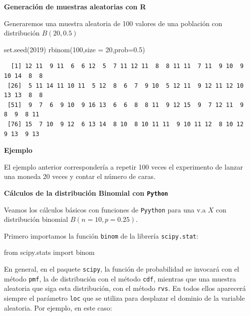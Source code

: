 \documentclass[
  letterpaper,
  DIV=11,
  numbers=noendperiod]{scrreprt}
\newenvironment{Shaded}{\begin{snugshade}}{\end{snugshade}}
\newcommand{\AttributeTok}[1]{\textcolor[rgb]{0.40,0.45,0.13}{#1}}
\newcommand{\DecValTok}[1]{\textcolor[rgb]{0.68,0.00,0.00}{#1}}
\newcommand{\FloatTok}[1]{\textcolor[rgb]{0.68,0.00,0.00}{#1}}
\newcommand{\FunctionTok}[1]{\textcolor[rgb]{0.28,0.35,0.67}{#1}}
\newcommand{\ImportTok}[1]{\textcolor[rgb]{0.00,0.46,0.62}{#1}}
\newcommand{\NormalTok}[1]{\textcolor[rgb]{0.00,0.23,0.31}{#1}}
\begin{document}
\textbf{Generación de muestras aleatorias con R}

Generaremos una muestra aleatoria de 100 valores de una población con
distribución \(B(20,0.5)\)

\begin{Shaded}
\begin{Highlighting}[]
\FunctionTok{set.seed}\NormalTok{(}\DecValTok{2019}\NormalTok{)}
\FunctionTok{rbinom}\NormalTok{(}\DecValTok{100}\NormalTok{,}\AttributeTok{size =} \DecValTok{20}\NormalTok{,}\AttributeTok{prob=}\FloatTok{0.5}\NormalTok{)}
\end{Highlighting}
\end{Shaded}

\begin{verbatim}
  [1] 12 11  9 11  6  6 12  5  7 11 12 11  8  8 11 11  7 11  9 10  9 10 14  8  8
 [26]  5 11 14 11 10 11  5 12  8  6  7  9 10  5 12 11  9 12 11 12 10 13 13  8  8
 [51]  9  7  6  9 10  9 16 13  6  6  8  8 11  9 12 15  9  7 12 11  9  8  9  8 11
 [76] 15  7 10  9 12  6 13 14  8 10  8 10 11 11  9 10 11 12  8 10 12  9 13  9 13
\end{verbatim}

\textbf{Ejemplo}

El ejemplo anterior correspondería a repetir 100 veces el experimento de
lanzar una moneda 20 veces y contar el número de caras.

\textbf{Cálculos de la distribución Binomial con \texttt{Python}}

Veamos los cálculos básicos con funciones de \texttt{Pyython} para una
v.a \(X\) con distribución binomial \(B(n=10,p=0.25)\).

Primero importamos la función \texttt{binom} de la librería
\texttt{scipy.stat}:

\begin{Shaded}
\begin{Highlighting}[]

\ImportTok{from}\NormalTok{ scipy.stats }\ImportTok{import}\NormalTok{ binom}
\end{Highlighting}
\end{Shaded}

En general, en el paquete \texttt{scipy}, la función de probabilidad se
invocará con el método \texttt{pmf}, la de distribución con el método
\texttt{cdf}, mientras que una muestra aleatoria que siga esta
distribución, con el método \texttt{rvs}. En todos ellos aparecerá
siempre el parámetro \texttt{loc} que se utiliza para desplazar el
dominio de la variable aleatoria. Por ejemplo, en este caso:
\end{document}
